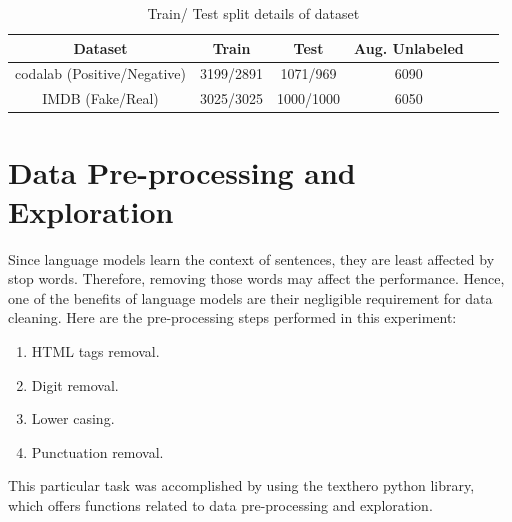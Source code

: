 \documentclass[%
	BCOR=8mm, %
	DIV=12,
	toc=bibliography, %
	toc=listof, %
	oneside, %
	egregdoesnotlikesansseriftitles, %
	]{scrbook}
\begin{document}
\begin{table}[!h]
\centering
\begin{tabular}{ |c|c|c|c|c|c| }
\hline
Dataset & Train & Test  & Aug. Unlabeled \\
\hline
codalab (Positive/Negative) & 3199/2891 & 1071/969 & 6090 \\
\hline
IMDB (Fake/Real) & 3025/3025 & 1000/1000 & 6050  \\
\hline
\end{tabular}
\caption[Train/Augment test data]{Train/ Test split details of dataset }
\label{table:train/testtable}
\end{table}

\section{Data Pre-processing and Exploration}
\label{section:datapreproc}
Since language models learn the context of sentences, they are least affected by stop words. Therefore, removing those words may affect the performance. Hence, one of the benefits of  language models are their negligible requirement for data cleaning. Here are the pre-processing steps performed in this experiment:
\begin{enumerate}
\item  HTML tags removal.
\item Digit removal.
\item Lower casing.
\item  Punctuation removal.
\end{enumerate}
This particular task was accomplished by using the texthero python library, which offers functions related to data pre-processing and exploration.
\end{document}
